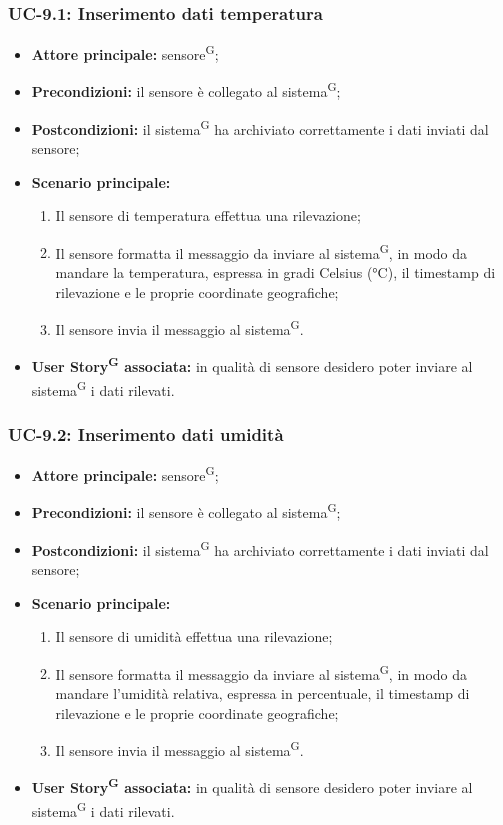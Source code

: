 \documentclass[8pt]{article}
\newcommand{\glossterm}[1]{#1\textsuperscript{G}} %
\begin{document}
\subsubsection*{UC-9.1: Inserimento dati temperatura}
\begin{itemize}
    \item \textbf{Attore principale:} \glossterm{sensore};
    \item \textbf{Precondizioni:} il sensore è collegato al \glossterm{sistema};
    \item \textbf{Postcondizioni:} il \glossterm{sistema} ha archiviato correttamente i dati inviati dal sensore;
    \item \textbf{Scenario principale:}
        \begin{enumerate}
        \item Il sensore di temperatura effettua una rilevazione;
        \item Il sensore formatta il messaggio da inviare al \glossterm{sistema}, in modo da mandare la
temperatura, espressa in gradi Celsius (°C), il timestamp di rilevazione e le proprie
coordinate geografiche;
        \item Il sensore invia il messaggio al \glossterm{sistema}.
        \end{enumerate}
    \item \textbf{\glossterm{User Story} associata:} in qualità di sensore desidero poter inviare al \glossterm{sistema} i
        dati rilevati.
\end{itemize}
\subsubsection*{UC-9.2: Inserimento dati umidità}
\begin{itemize}
    \item \textbf{Attore principale:} \glossterm{sensore};
    \item \textbf{Precondizioni:} il sensore è collegato al \glossterm{sistema};
    \item \textbf{Postcondizioni:} il \glossterm{sistema} ha archiviato correttamente i dati inviati dal sensore;
    \item \textbf{Scenario principale:}
        \begin{enumerate}
        \item Il sensore di umidità effettua una rilevazione;
        \item Il sensore formatta il messaggio da inviare al \glossterm{sistema}, in modo da mandare l'umidità
            relativa, espressa in percentuale, il timestamp di rilevazione e le proprie
coordinate geografiche;
        \item Il sensore invia il messaggio al \glossterm{sistema}.
        \end{enumerate}
    \item \textbf{\glossterm{User Story} associata:} in qualità di sensore desidero poter inviare al \glossterm{sistema} i
        dati rilevati.
\end{itemize}
\end{document}
